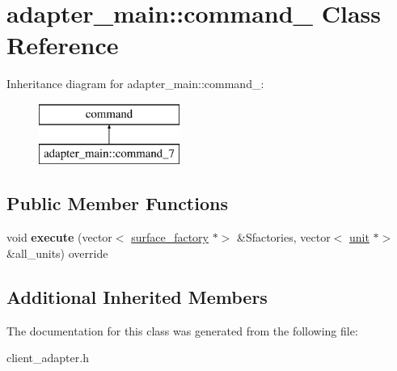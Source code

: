 \hypertarget{classadapter__main_1_1command__7}{}\section{adapter\+\_\+main\+:\+:command\+\_ Class Reference}
\label{classadapter__main_1_1command__7}
Inheritance diagram for adapter\+\_\+main\+:\+:command\+\_\+:\begin{figure}[H]
\begin{center}
\leavevmode
\includegraphics[height=2.000000cm]{classadapter__main_1_1command__7}
\end{center}
\end{figure}
\subsection*{Public Member Functions}
\begin{DoxyCompactItemize}
\item 
\mbox{\label{classadapter__main_1_1command__7_a71fac9c70e9725e59f106195f8888e36}} 
void {\bfseries execute} (vector$<$ \mbox{\hyperlink{classsurface__factory}{surface\+\_\+factory}} $\ast$$>$ \&Sfactories, vector$<$ \mbox{\hyperlink{classunit}{unit}} $\ast$$>$ \&all\+\_\+units) override
\end{DoxyCompactItemize}
\subsection*{Additional Inherited Members}


The documentation for this class was generated from the following file\+:\begin{DoxyCompactItemize}
\item 
client\+\_\+adapter.\+h\end{DoxyCompactItemize}
